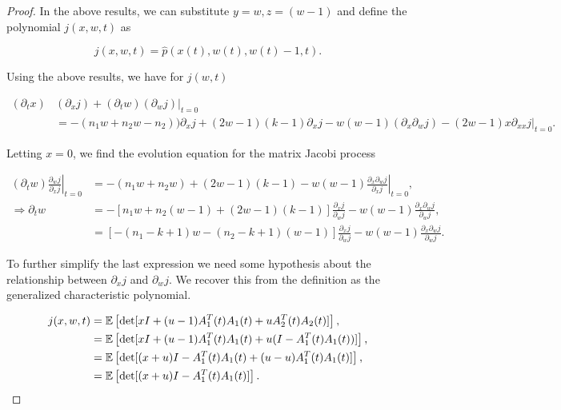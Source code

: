     \begin{proof}

    In the above results, we can substitute $y = w, z = (w-1)$ and define the polynomial $j(x,w,t)$ as

    \begin{equation*}
        j(x,w,t) = \hat p(x(t), w(t), w(t)-1, t).
    \end{equation*}

    Using the above results, we have for $j(w,t)$

    \begin{align*}
        (\partial_t x)&(\partial_x j) + (\partial_t w)(\partial_w j)|_{t=0} \\
        &= -(n_1w + n_2w-n_2))\partial_x j + (2w-1)(k-1)\partial_x j - w(w-1)(\partial_x\partial_w j) - (2w-1)x\partial_{xx} j|_{t=0}.
    \end{align*}

    Letting $x=0$, we find the evolution equation for the matrix Jacobi process

    \begin{align*}
        \left.(\partial_t w)\frac{\partial_w j}{\partial_x j}\right|_{t=0} &= \left.-(n_1w + n_2w) + (2w-1)(k-1) - w(w-1)\frac{\partial_x\partial_w j}{\partial_x j}\right|_{t=0},\\
        \Rightarrow \partial_t w &= -[n_1w + n_2 (w-1) +(2w-1)(k-1)]\frac{\partial_x j}{\partial_w j} - w(w-1)\frac{\partial_x\partial_w j}{\partial_w j},\\ 
        &= [-(n_1-k+1)w - (n_2 -k+1)(w-1)]\frac{\partial_x j}{\partial_w j} - w(w-1)\frac{\partial_x\partial_w j}{\partial_w j}.
    \end{align*}

    To further simplify the last expression we need some hypothesis about the relationship between $\partial_x j$ and $\partial_w j$. We recover this from the definition as the generalized characteristic polynomial.

    \begin{align*}
        j(x,w,t) &= \mathbb E \left[  \det[ xI + (u-1)A^T_1(t) A_1(t) + u A^T_2(t) A_2(t) ]  \right], \\
        &= \mathbb E \left[  \det[ xI + (u-1)A^T_1(t) A_1(t) + u (I - A^T_1(t) A_1(t)) ]  \right], \\
        &= \mathbb E \left[  \det[ (x+u)I - A^T_1(t) A_1(t) +(u-u)A^T_1(t) A_1(t) ]  \right], \\
        &= \mathbb E \left[  \det[ (x+u)I - A^T_1(t) A_1(t)]  \right].
    \end{align*}


\end{proof}
